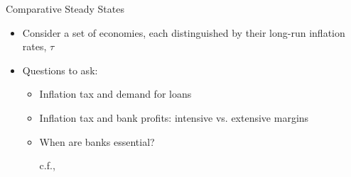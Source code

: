 \documentclass[10pt,english,slidetop,compress,
              blue,mathserif,color=option]{beamer}
\theoremstyle{plain}
\theoremstyle{definition}
\begin{document}
\begin{frame}{Comparative Steady States}
  \begin{itemize}
    \item Consider a set of economies, each distinguished by their long-run inflation rates, $\tau$

    \bigskip


    \item Questions to ask:
      \begin{itemize}
        \item Inflation tax and demand for loans

        \item Inflation tax and bank profits: intensive vs. extensive margins

        \item When are banks essential?

          \medskip

          \hfill c.f., \citet{Berentsen2007}

      \end{itemize}
  \end{itemize}
\end{frame}

\end{document}

